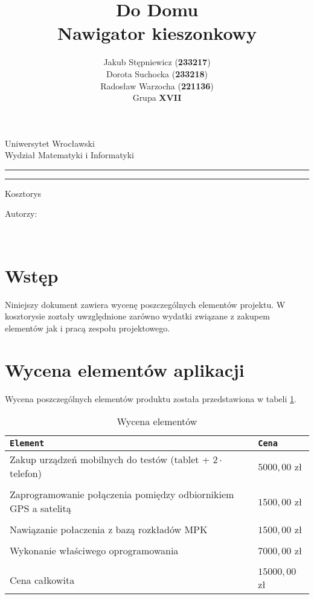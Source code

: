 \documentclass[12pt,a4paper]{article}
\author{Jakub Stępniewicz (\textbf{233217})\\Dorota Suchocka (\textbf{233218})\\ Radosław Warzocha (\textbf{221136})\\Grupa {\bf XVII}}
\title{Do Domu\\ \small{Nawigator kieszonkowy}}
\makeatletter
\newcommand{\linia}{\rule{\linewidth}{0.4mm}}
\renewcommand{\maketitle}{\begin{titlepage}
		\vspace*{1cm}
    \begin{center}\small
    	Uniwersytet Wrocławski\\
    	Wydział Matematyki i Informatyki\\
    \end{center}
    \vspace{3cm}
    \noindent
    \linia
    \begin{center}
    	\LARGE{\textsc{\@title}}
         \end{center}
     \linia
    \begin{center}
    	\Large{Kosztorys}
         \end{center}
    \vspace{0.5cm}

    \begin{flushright}

    \begin{minipage}{5.5cm}

    	\small Autorzy:

    \normalsize {\@author} \par
    

    \end{minipage}
    \vspace{5cm}

     

     \end{flushright}

    \vspace*{\stretch{6}}

    \begin{center}

    \@date\\

    \end{center}

  \end{titlepage}%

}
\makeatother
\begin{document}
\maketitle
\tableofcontents
\vspace{5cm}

\newpage
% 
\section{Wstęp}
Niniejszy dokument zawiera wycenę poszczególnych elementów projektu. W kosztorysie zoztały
uwzględnione zarówno wydatki związane z zakupem elementów jak i pracą zespołu projektowego.

\section{Wycena elementów aplikacji}
	Wycena poszczególnych elementów produktu została przedstawiona w tabeli \ref{wycena}.
	\begin{table}[h]
 \caption{Wycena elementów}
 \begin{center}
	\begin{tabular}{l|l}
	\texttt{Element} & \texttt{Cena}  \\\hline
	Zakup urządzeń mobilnych do testów (tablet + $2 \cdot$telefon) & $5 000,00$ zł \\\\
	Zaprogramowanie połączenia pomiędzy odbiornikiem GPS a satelitą & $1 500,00$ zł \\\\
	Nawiązanie połaczenia z bazą rozkładów MPK & $1 500,00$ zł \\\\
	Wykonanie właściwego oprogramowania & $7 000,00$ zł \\\\
 \hline\\
 Cena całkowita & $15 000,00$ zł
\end{tabular}
\end{center}
 \label{wycena}
\end{table}
\end{document}
